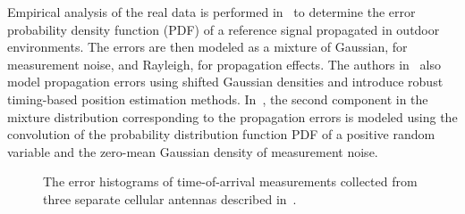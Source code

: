 \documentclass[journal]{IEEEtran}
\begin{document}
Empirical analysis of the real data is performed in~\cite{conf:ICASSP_huerta_05} to determine the error probability density function (PDF) of a reference signal propagated in outdoor environments. The errors are then modeled as a mixture of Gaussian, for measurement noise, and Rayleigh, for propagation effects.  The authors in~\cite{article:ITWC_liao_06,conf:ICASSP_fritsche_09,conf:ESPC_fritsche_09,article:ITSP_hammes_11} also model propagation errors using shifted Gaussian densities and introduce robust timing-based position estimation methods. In~\cite{article:IJSTSP_hammes_09}, the second component in the mixture distribution corresponding to the propagation errors is modeled using the convolution of the probability distribution function PDF of a positive random variable and the zero-mean Gaussian density of measurement noise.
%
%
\begin{figure}[]
	\centering
	\hfil
	\hfil
	\caption{The error histograms of time-of-arrival measurements collected from three separate cellular antennas described in~\cite{conf:PIMRC_medbo_09}.}
	\label{fig:kista}
\end{figure}
%
%
\end{document}
